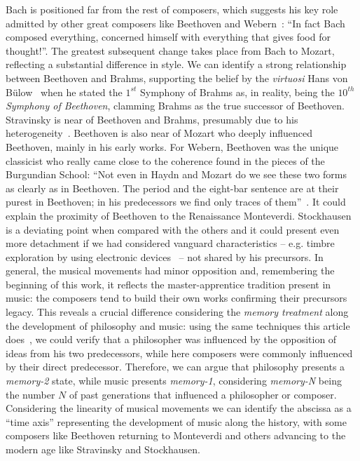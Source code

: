 \documentclass[
 aip,
 jmp,
 amsmath,amssymb,
 reprint,
]{revtex4-1}
\begin{document}
Bach is positioned far from the rest of
composers, which suggests his key role
admitted by other great composers like Beethoven and
Webern~\cite{Webern}: ``In fact Bach composed everything, concerned
himself with everything that gives food for thought!''. 
The greatest subsequent change takes place from Bach to Mozart,
reflecting a substantial difference in style.
We can identify a strong relationship between
Beethoven and Brahms, supporting the belief by the \textit{virtuosi} Hans von B\"{u}low~\cite{Bulow} when he
stated the $1^{st}$ Symphony of Brahms as, in reality, being the \textit{$10^{th}$ Symphony of
Beethoven}, clamming Brahms as the true successor of
Beethoven. Stravinsky is near of Beethoven and Brahms,
presumably due to his heterogeneity~\cite{BennettHistory,
  Lovelock}. Beethoven is also near of Mozart who deeply influenced
Beethoven, mainly in his early works.
For Webern, Beethoven was the unique classicist who really came close
to the coherence found in the pieces of the Burgundian School: ``Not even
in Haydn and Mozart do we see these two forms as clearly as in
Beethoven. The period and the eight-bar sentence are at their purest
in Beethoven; in his predecessors we find only traces of them''~\cite{Webern}. It
could explain the proximity of Beethoven to the Renaissance  Monteverdi.
Stockhausen is a deviating point when compared with the others and it
could present even more detachment if we had considered
vanguard characteristics -- e.g. timbre exploration by using
electronic devices~\cite{Lovelock} -- not
shared by his precursors.
In general, the musical movements had minor opposition and,
remembering the beginning of this work, it reflects the
master-apprentice
tradition present in music: the composers tend to build their own
works confirming their precursors legacy. This reveals a crucial difference
considering the \textit{memory treatment} along the development of
philosophy and music: using the same techniques this article does~\cite{Fabbri},
we could verify that a philosopher was influenced by the
opposition of ideas from his two predecessors, while here composers were commonly
influenced by their direct predecessor. Therefore, we can argue that philosophy
presents a \textit{memory-2} state, while music presents
\textit{memory-1}, considering \textit{memory-N} being the number $N$
of past generations that influenced a philosopher or
composer. Considering the linearity of musical movements we can
identify the abscissa as a ``time axis'' representing the development
of music along the history, with some composers
like Beethoven returning to Monteverdi and others advancing to the
modern age like Stravinsky and Stockhausen.
\end{document}

